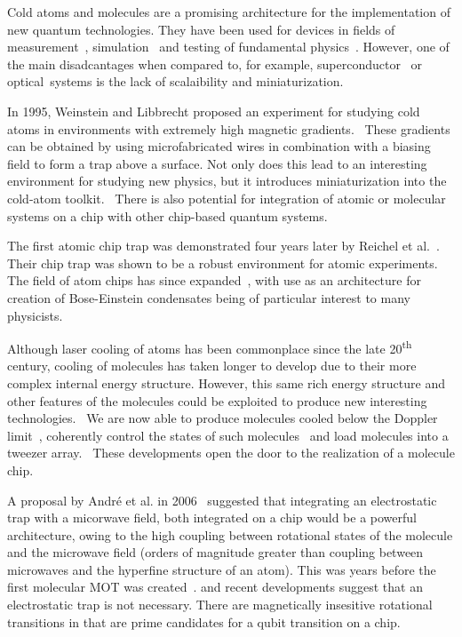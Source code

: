 Cold atoms and molecules are a promising architecture for the implementation of
new quantum technologies. They have been used for devices in fields of
measurement~\cite{Campbell90}, simulation~\cite{Gross995} and testing of
fundamental physics~\cite{DeMille990}. However, one of the
main disadcantages when compared to, for example,
superconductor~\cite{Wallraff2004} or
optical~\cite{Browne2017}systems is the lack of
scalaibility and miniaturization.~\cite{nielsenandchuang}

In 1995, Weinstein and Libbrecht proposed an experiment for
studying cold atoms in environments with extremely high magnetic
gradients.~\cite{PhysRevA.52.4004} These gradients can be obtained by using
microfabricated wires in combination with a biasing field to form a trap above
a surface. Not only does this lead to an interesting environment for studying
new physics, but it introduces miniaturization into the cold-atom
toolkit.~\cite{2011Ac} There is also potential for integration of atomic or
molecular systems on a chip with other chip-based quantum
systems.~\cite{2011Ac, Kubo2011}

The first atomic chip trap was demonstrated four years later by Reichel et
al.~\cite{Reichel1999}. Their chip trap was shown to be a robust environment for
atomic experiments. The field of atom chips has since expanded~\cite{2011Ac},
with use as an architecture for creation of Bose-Einstein condensates being of
particular interest to many physicists.~\cite{Ott2001}

Although laser cooling of atoms has been commonplace since the late
20\textsuperscript{th} century, cooling of molecules has taken longer to develop
due to their more complex internal energy structure. However, this same rich
energy structure and other features of the molecules could be exploited to
produce new interesting technologies.~\cite{Tarbutt2018} We are now able to
produce \CaF molecules cooled below the Doppler limit~\cite{Truppe2017},
coherently control the states of such molecules~\cite{PhysRevLett.120.163201}
and load molecules into a tweezer array.~\cite{Anderegg2019} These developments
open the door to the realization of a molecule chip.

A proposal by Andr\'e et al. in 2006~\cite{Andre2006} suggested that integrating
an electrostatic trap with a micorwave field, both integrated on a chip would be
a powerful architecture, owing to the high coupling between rotational states of
the molecule and the microwave field (orders of magnitude greater than coupling
between microwaves and the hyperfine structure of an atom). This was years before
the first molecular MOT was created~\cite{Barry2014}. and recent developments
suggest that an electrostatic trap is not necessary. There are magnetically
insesitive rotational transitions in \CaF that are prime candidates for a qubit
transition on a chip.~\cite{} 

